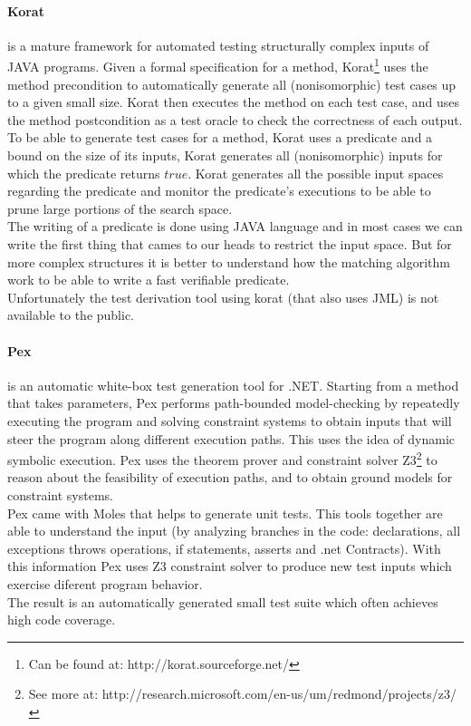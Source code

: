 \documentclass{llncs}
\begin{document}

\paragraph{\textbf{Korat}\cite{Boyapati02korat:automated}}
is a mature framework for automated testing structurally complex inputs of JAVA programs.
Given a formal specification for a method, Korat\footnote{Can be found at: http://korat.sourceforge.net/} uses the method precondition
to automatically generate all (nonisomorphic) test cases up to a given small size.
Korat then executes the method on each test case, and uses the method postcondition as a test oracle to check the correctness of each output.\\
To be able to generate test cases for a method, Korat uses a predicate and a bound on the size of its inputs,
Korat generates all (nonisomorphic) inputs for which the predicate returns $true$.
Korat generates all the possible input spaces regarding the predicate and monitor the predicate's executions to be able to prune large portions of the search space.\\

The writing of a predicate is done using JAVA language and in most cases we can write the first thing that cames to our heads to restrict the input space.
But for more complex structures it is better to understand how the matching algorithm work to be able to write a fast verifiable predicate.\\
Unfortunately the test derivation tool using korat (that also uses JML) is not available to the public.

\paragraph{\textbf{Pex}\cite{Tillmann:2008:PWB:1792786.1792798}} is an automatic white-box test generation tool for .NET. Starting from a method that takes parameters, Pex performs path-bounded model-checking
by repeatedly executing the program and solving constraint systems to obtain inputs that will steer the program along different execution paths.
This uses the idea of dynamic symbolic execution\cite{Tillmann06unittests}. Pex uses the theorem prover and
constraint solver Z3\footnote{See more at: http://research.microsoft.com/en-us/um/redmond/projects/z3/} to reason about the feasibility of execution paths, and
to obtain ground models for constraint systems.\\
Pex came with Moles that helps to generate unit tests. This tools together are able to understand the input (by analyzing branches in the code:
declarations, all exceptions throws operations, if statements, asserts and .net Contracts). With this information Pex uses Z3 constraint solver to
produce new test inputs which exercise diferent program behavior.\\
The result is an automatically generated small test suite which often achieves high code coverage.\\
\end{document}
